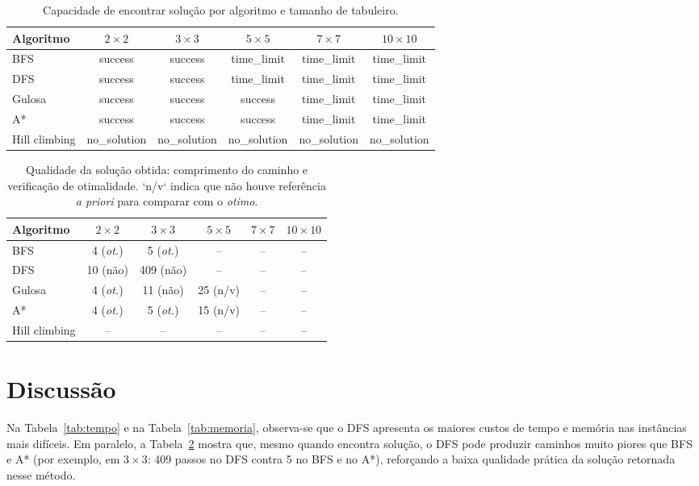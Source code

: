 \documentclass[12pt,a4paper]{article}
\begin{document}
\begin{table}[H]
\centering
\begin{tabular}{lccccc}
\toprule
Algoritmo & $2\times 2$ & $3\times 3$ & $5\times 5$ & $7\times 7$ & $10\times 10$ \\
\midrule
BFS & success & success & time\_limit & time\_limit & time\_limit \\
DFS & success & success & time\_limit & time\_limit & time\_limit \\
Gulosa & success & success & success & time\_limit & time\_limit \\
A* & success & success & success & time\_limit & time\_limit \\
Hill climbing & no\_solution & no\_solution & no\_solution & no\_solution & no\_solution \\
\bottomrule
\end{tabular}
\caption{Capacidade de encontrar solu\c{c}\~ao por algoritmo e tamanho de tabuleiro.}
\label{tab:sucesso}
\end{table}

\begin{table}[H]
\centering
\begin{tabular}{lccccc}
\toprule
Algoritmo & $2\times 2$ & $3\times 3$ & $5\times 5$ & $7\times 7$ & $10\times 10$ \\
\midrule
BFS & 4 (\textit{ot.}) & 5 (\textit{ot.}) & -- & -- & -- \\
DFS & 10 (n\~ao) & 409 (n\~ao) & -- & -- & -- \\
Gulosa & 4 (\textit{ot.}) & 11 (n\~ao) & 25 (n/v) & -- & -- \\
A* & 4 (\textit{ot.}) & 5 (\textit{ot.}) & 15 (n/v) & -- & -- \\
Hill climbing & -- & -- & -- & -- & -- \\
\bottomrule
\end{tabular}
\caption{Qualidade da solu\c{c}\~ao obtida: comprimento do caminho e verifica\c{c}\~ao de otimalidade. `n/v` indica que n\~ao houve refer\^encia \textit{a priori} para comparar com o \textit{otimo}.}
\label{tab:qualidade}
\end{table}

\section{Discuss\~ao}

Na Tabela~\ref{tab:tempo} e na Tabela~\ref{tab:memoria}, observa-se que o DFS apresenta os maiores custos de tempo e mem\'oria nas inst\^ancias mais dif\'iceis. Em paralelo, a Tabela~\ref{tab:qualidade} mostra que, mesmo quando encontra solu\c{c}\~ao, o DFS pode produzir caminhos muito piores que BFS e A* (por exemplo, em $3\times 3$: 409 passos no DFS contra 5 no BFS e no A*), refor\c{c}ando a baixa qualidade pr\'atica da solu\c{c}\~ao retornada nesse m\'etodo.
\end{document}
